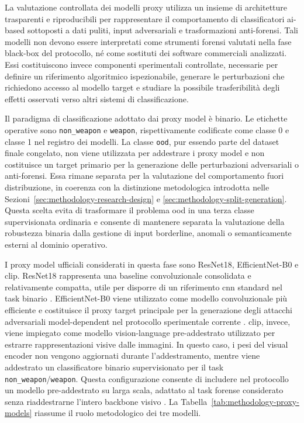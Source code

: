 La valutazione controllata dei modelli proxy utilizza un insieme di architetture
trasparenti e riproducibili per rappresentare il comportamento di classificatori
\gls{ai}-based sottoposti a dati puliti, input adversariali e trasformazioni
anti-forensi. Tali modelli non devono essere interpretati come strumenti forensi valutati
nella fase black-box del protocollo, né come sostituti dei software commerciali
analizzati. Essi costituiscono invece componenti sperimentali controllate, necessarie per
definire un riferimento algoritmico ispezionabile, generare le perturbazioni che
richiedono accesso al modello target e studiare la possibile trasferibilità
degli effetti osservati verso altri sistemi di classificazione.


Il paradigma di classificazione adottato dai proxy model è binario. Le etichette
operative sono \texttt{non\_weapon} e \texttt{weapon}, rispettivamente codificate
come classe 0 e classe 1 nel registro dei modelli. La classe \texttt{ood}, pur
essendo parte del dataset finale congelato, non viene utilizzata per addestrare
i proxy model e non costituisce un target primario per la generazione delle
perturbazioni adversariali o anti-forensi. Essa rimane separata per la valutazione
del comportamento fuori distribuzione, in coerenza con la distinzione metodologica
introdotta nelle Sezioni~\ref{sec:methodology-research-design} e
\ref{sec:methodology-split-generation}. Questa scelta evita di trasformare il
problema \gls{ood} in una terza classe supervisionata ordinaria e consente di
mantenere separata la valutazione della robustezza binaria dalla gestione di
input borderline, anomali o semanticamente esterni al dominio operativo.

I proxy model ufficiali considerati in questa fase sono ResNet18,
EfficientNet-B0 e \gls{clip}. ResNet18 rappresenta una baseline convoluzionale
consolidata e relativamente compatta, utile per disporre di un riferimento
\gls{cnn} standard nel task binario \cite{he2016deep}. EfficientNet-B0 viene
utilizzato come modello convoluzionale più efficiente e costituisce il proxy
target principale per la generazione degli attacchi adversariali
model-dependent nel protocollo sperimentale corrente \cite{tan2019efficientnet}.
\gls{clip}, invece, viene impiegato come modello vision-language pre-addestrato
utilizzato per estrarre rappresentazioni visive dalle immagini. In questo caso,
i pesi del visual encoder non vengono aggiornati durante l'addestramento,
mentre viene addestrato un classificatore binario supervisionato per il task
\texttt{non\_weapon}/\texttt{weapon}. Questa configurazione consente di includere
nel protocollo un modello pre-addestrato su larga scala, adattato al task
forense considerato senza riaddestrarne l'intero backbone visivo
\cite{radford2021learning}. La Tabella~\ref{tab:methodology-proxy-models}
riassume il ruolo metodologico dei tre modelli.



